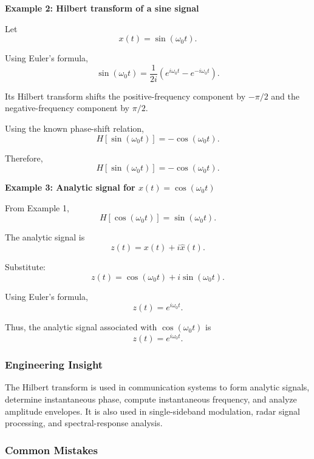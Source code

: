 \begin{examplebox}
    \textbf{Example 2: Hilbert transform of a sine signal}

    Let
    \[
        x(t)=\sin(\omega_0t).
    \]

    Using Euler's formula,
    \[
        \sin(\omega_0t)
        =
        \frac{1}{2i}
        \left(e^{i\omega_0t}-e^{-i\omega_0t}\right).
    \]

    Its Hilbert transform shifts the positive-frequency component by $-\pi/2$ and the negative-frequency component by $\pi/2$.

    Using the known phase-shift relation,
    \[
        H[\sin(\omega_0t)] = -\cos(\omega_0t).
    \]

    Therefore,
    \[
        \boxed{
            H[\sin(\omega_0t)] = -\cos(\omega_0t)
        }.
    \]
\end{examplebox}

\begin{examplebox}
    \textbf{Example 3: Analytic signal for $x(t)=\cos(\omega_0t)$}

    From Example 1,
    \[
        H[\cos(\omega_0t)] = \sin(\omega_0t).
    \]

    The analytic signal is
    \[
        z(t)=x(t)+i\hat{x}(t).
    \]

    Substitute:
    \[
        z(t)=\cos(\omega_0t)+i\sin(\omega_0t).
    \]

    Using Euler's formula,
    \[
        z(t)=e^{i\omega_0t}.
    \]

    Thus, the analytic signal associated with $\cos(\omega_0t)$ is
    \[
        \boxed{
            z(t)=e^{i\omega_0t}
        }.
    \]
\end{examplebox}

\subsubsection*{Engineering Insight}

\begin{noteBox}
    The Hilbert transform is used in communication systems to form analytic signals, determine instantaneous phase, compute instantaneous frequency, and analyze amplitude envelopes. It is also used in single-sideband modulation, radar signal processing, and spectral-response analysis.
\end{noteBox}

\subsubsection*{Common Mistakes}

